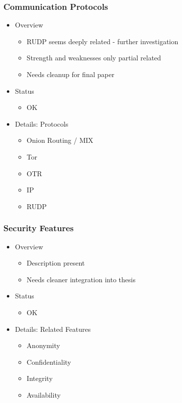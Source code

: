 \documentclass{beamer}
\begin{document}
\frame
{
  \frametitle{Communication Protocols}
  \begin{itemize}
     \item Overview
      \begin{itemize}
          \item RUDP seems deeply related - further investigation
          \item Strength and weaknesses only partial related
          \item Needs cleanup for final paper
      \end{itemize}
      \item Status
      \begin{itemize}
          \item OK
      \end{itemize}
      \pause \item Details: Protocols
      \begin{itemize}
          \item Onion Routing / MIX
          \item Tor
          \item OTR
          \item IP
          \item RUDP
      \end{itemize}
   \end{itemize}
}

\frame
{
  \frametitle{Security Features}
  \begin{itemize}
     \item Overview
      \begin{itemize}
          \item Description present
          \item Needs cleaner integration into thesis
      \end{itemize}
      \item Status
      \begin{itemize}
          \item OK
      \end{itemize}
      \pause \item Details: Related Features
      \begin{itemize}
          \item Anonymity
          \item Confidentiality
          \item Integrity
          \item Availability
      \end{itemize}
   \end{itemize}
}
\end{document}
